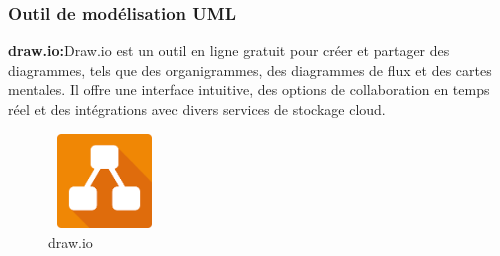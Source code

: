 \documentclass[edit,12pt,a4paper,ChapStyle,oneside,doubleinterligne]{report}
\begin{document}
\subsubsection{ Outil de modélisation UML }
\textbf{draw.io:}Draw.io est un outil en ligne gratuit pour créer et partager des diagrammes, tels que des organigrammes, des diagrammes de flux et des cartes mentales. Il offre une interface intuitive, des options de collaboration en temps réel et des intégrations avec divers services de stockage cloud.\cite{drawio}
\begin{figure}[H]\label{fig:draw.io}
    \centering
    \includegraphics[width=3cm , height = 2.5cm , angle=360]{images/drawio.png}
    \caption{draw.io}
    \end{figure}
\end{document}
